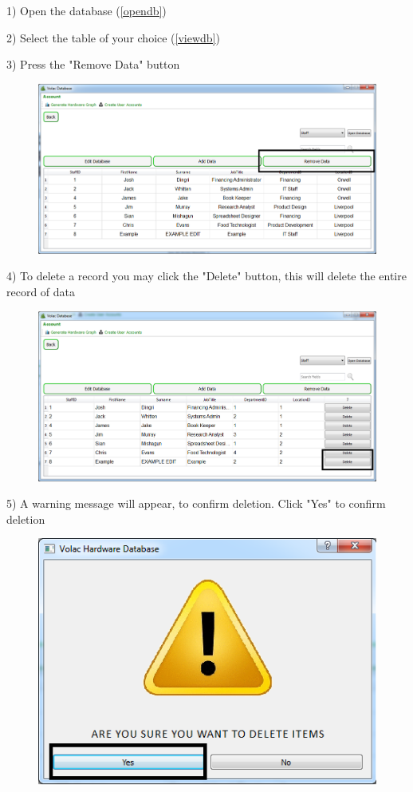 1) Open the database (\ref{opendb})

2) Select the table of your choice (\ref{viewdb})

3) Press the "Remove Data" button

\begin{figure}[H]
    \includegraphics[width=\textwidth]{./Manual/Images/deletedata.png}
\end{figure}

4) To delete a record you may click the "Delete" button, this will delete the entire record of data

\begin{figure}[H]
    \includegraphics[width=\textwidth]{./Manual/Images/deletedata2.png}
\end{figure}

5) A warning message will appear, to confirm deletion. Click "Yes" to confirm deletion

\begin{figure}[H]
    \includegraphics[width=\textwidth]{./Manual/Images/deletedata3.png}
\end{figure}

